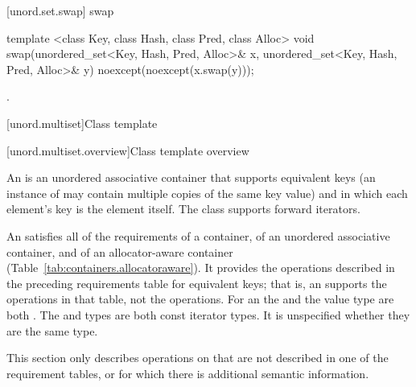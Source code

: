 [unord.set.swap]{ swap}

%
%
\begin{itemdecl}
template <class Key, class Hash, class Pred, class Alloc>
  void swap(unordered_set<Key, Hash, Pred, Alloc>& x,
            unordered_set<Key, Hash, Pred, Alloc>& y)
    noexcept(noexcept(x.swap(y)));
\end{itemdecl}

\begin{itemdescr}
\pnum\effects {}.
\end{itemdescr}

[unord.multiset]{Class template }%

[unord.multiset.overview]{Class template  overview}

\pnum
{}%
%
An  is an unordered associative container
that supports equivalent keys (an instance of  may contain
multiple copies of the same key value) and in which each element's key
is the element itself.
The  class
supports forward iterators.

\pnum
An  satisfies all of the requirements of a container, of an
unordered associative container, and of an allocator-aware container
(Table~\ref{tab:containers.allocatoraware}). It provides the operations described in the
preceding requirements table for equivalent keys; that is, an 
supports the  operations in that table, not the  operations.
For an  the  and the value type are
both . The  and  types are both const
iterator types. It is unspecified whether they are the same type.

\pnum
This section only describes operations on  that
are not described in one of the requirement tables, or for which there
is additional semantic information.


